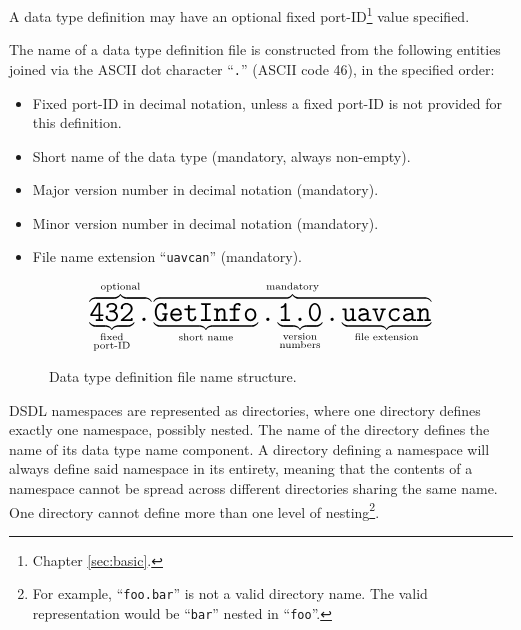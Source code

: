A data type definition may have an optional fixed port-ID\footnote{Chapter \ref{sec:basic}.} value specified.

The name of a data type definition file is constructed from the following entities
joined via the ASCII dot character ``\verb|.|'' (ASCII code 46), in the specified order:
\begin{itemize}
    \item Fixed port-ID in decimal notation, unless a fixed port-ID is not provided for this definition.
    \item Short name of the data type (mandatory, always non-empty).
    \item Major version number in decimal notation (mandatory).
    \item Minor version number in decimal notation (mandatory).
    \item File name extension ``\verb|uavcan|'' (mandatory).
\end{itemize}

\begin{figure}[H]
    $$
    \overbrace{%
        \underbrace{\texttt{\huge{432}}}_{\substack{\text{fixed} \\ \text{port-ID}}}%
        \texttt{\huge{.}}%
    }^{\text{optional}}%
    \overbrace{%
        \underbrace{\texttt{\huge{GetInfo}}}_{\substack{\text{short name}}}%
        \texttt{\huge{.}}%
        \underbrace{\texttt{\huge{1.0}}}_{\substack{\text{version} \\ \text{numbers}}}%
        \texttt{\huge{.}}%
        \underbrace{\texttt{\huge{uavcan}}}_{\text{file extension}}%
    }^{\text{mandatory}}
    $$
    \caption{Data type definition file name structure.\label{fig:dsdl_definition_file_name_structure}}
\end{figure}

DSDL namespaces are represented as directories, where one directory defines exactly one namespace, possibly nested.
The name of the directory defines the name of its data type name component.
A directory defining a namespace will always define said namespace in its entirety,
meaning that the contents of a namespace cannot be spread across different directories sharing the same name.
One directory cannot define more than one level of
nesting\footnote{For example, ``\texttt{foo.bar}'' is not a valid directory name.
The valid representation would be ``\texttt{bar}'' nested in ``\texttt{foo}''.}.

